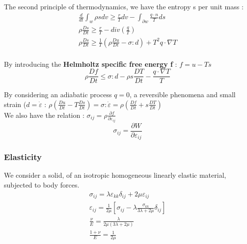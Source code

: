 \documentclass[../main.tex]{subfiles}
\begin{document}
The second principle of thermodynamics, we have the entropy s per unit mass : \begin{equation}\begin{gathered}
    \frac{d}{dt} \int_w \rho s dv \geq \frac{r}{T}dv - \int_{\partial w} \frac{q\cdot n}{T}ds\\
    \rho \frac{Ds}{Dt} \geq \frac{r}{T} - div(\frac{q}{T})\\
    \rho \frac{Ds}{Dt} \geq \frac{1}{T}(\rho \frac{Du}{Dt} - \sigma : d) + T^2 q\cdot \nabla T\\
    \end{gathered}
\end{equation}

By introducing the \textbf{Helmholtz specific free energy f} : $f = u-Ts$\\

\begin{equation}
    \rho \frac{Df}{Dt} \leq \sigma : d - \rho s \frac{DT}{Dt} - \frac{q \cdot \nabla T}{T}
\end{equation}

By considering an adiabatic process $q=0$, a reversible phenomena and small strain ($d = \dot{\varepsilon}$ : $\rho(\frac{Du}{Dt} - T \frac{Ds}{Dt}) = \sigma : \dot{\varepsilon} = \rho(\frac{Df}{Dt} + s\frac{DT}{Dt})$\\

We also have the relation : $\sigma_{ij} = \rho \frac{\partial f}{\partial \varepsilon_{ij}}$\\

\begin{equation}
    \sigma_{ij} = \frac{\partial W}{\partial \varepsilon_{ij}}
\end{equation}

\subsubsection{Elasticity}
We consider a solid, of an isotropic homogeneous linearly elastic material, subjected to body forces.\\

\begin{equation}
    \begin{gathered}
        \sigma_{ij} = \lambda \varepsilon_{kk} \delta_{ij} + 2\mu \varepsilon_{ij}\\
        \varepsilon_{ij} = \frac{1}{2\mu} [ \sigma_{ij} - \lambda \frac{\sigma_{kk}}{3\lambda + 2\mu} \delta_{ij}]\\
        \frac{\nu}{E} = \frac{\lambda}{2\mu(3\lambda + 2\mu)}\\
        \frac{1+\nu}{E} = \frac{1}{2\mu}\\
    \end{gathered}
\end{equation}
\end{document}
